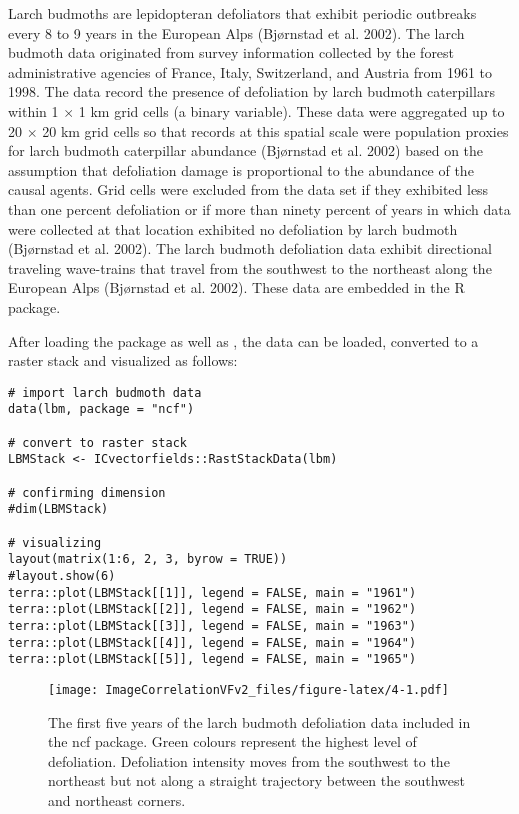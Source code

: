 Larch budmoths are lepidopteran defoliators that exhibit periodic outbreaks every 8 to 9 years in the European Alps (Bjørnstad et al. 2002). The larch budmoth data originated from survey information collected by the forest administrative agencies of France, Italy, Switzerland, and Austria from 1961 to 1998. The data record the presence of defoliation by larch budmoth caterpillars within 1 \(\times\) 1 km grid cells (a binary variable). These data were aggregated up to 20 \(\times\) 20 km grid cells so that records at this spatial scale were population proxies for larch budmoth caterpillar abundance (Bjørnstad et al. 2002) based on the assumption that defoliation damage is proportional to the abundance of the causal agents. Grid cells were excluded from the data set if they exhibited less than one percent defoliation or if more than ninety percent of years in which data were collected at that location exhibited no defoliation by larch budmoth (Bjørnstad et al. 2002). The larch budmoth defoliation data exhibit directional traveling wave-trains that travel from the southwest to the northeast along the European Alps (Bjørnstad et al. 2002). These data are embedded in the  R package.

After loading the  package as well as , the data can be loaded, converted to a raster stack and visualized as follows:

\begin{verbatim}
# import larch budmoth data
data(lbm, package = "ncf")

# convert to raster stack
LBMStack <- ICvectorfields::RastStackData(lbm)

# confirming dimension
#dim(LBMStack)

# visualizing
layout(matrix(1:6, 2, 3, byrow = TRUE))
#layout.show(6)
terra::plot(LBMStack[[1]], legend = FALSE, main = "1961")
terra::plot(LBMStack[[2]], legend = FALSE, main = "1962")
terra::plot(LBMStack[[3]], legend = FALSE, main = "1963")
terra::plot(LBMStack[[4]], legend = FALSE, main = "1964")
terra::plot(LBMStack[[5]], legend = FALSE, main = "1965")
\end{verbatim}

\begin{figure}
\centering
\texttt{[image: ImageCorrelationVFv2\_files/figure-latex/4-1.pdf]}
\caption{\label{fig:4}The first five years of the larch budmoth defoliation data included in the ncf package. Green colours represent the highest level of defoliation. Defoliation intensity moves from the southwest to the northeast but not along a straight trajectory between the southwest and northeast corners.}
\end{figure}

